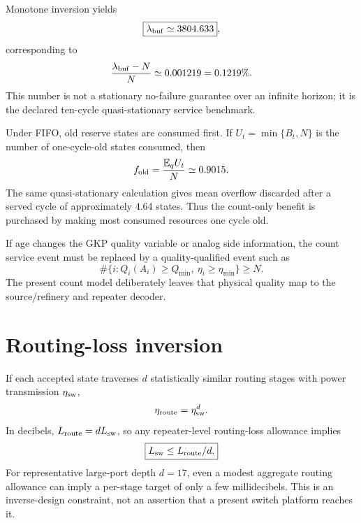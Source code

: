 \documentclass[aps,prx,preprint,superscriptaddress,nofootinbib,longbibliography]{revtex4-2}
\newcommand{\E}{\mathbb E}\newcommand{\Prob}{\mathbb P}
\begin{document}
Monotone inversion yields
\begin{equation}
\boxed{\lambda_{\rm buf}\simeq3804.633},
\end{equation}
corresponding to
\begin{equation}
\frac{\lambda_{\rm buf}-N}{N}\simeq0.001219=0.1219\%.
\end{equation}
This number is not a stationary no-failure guarantee over an infinite horizon; it is the declared ten-cycle quasi-stationary service benchmark.

Under FIFO, old reserve states are consumed first. If $U_t=\min\{B_t,N\}$ is the number of one-cycle-old states consumed, then
\begin{equation}
f_{\rm old}=\frac{\E_q U_t}{N}\simeq0.9015.
\end{equation}
The same quasi-stationary calculation gives mean overflow discarded after a served cycle of approximately 4.64 states. Thus the count-only benefit is purchased by making most consumed resources one cycle old.

If age changes the GKP quality variable or analog side information, the count service event must be replaced by a quality-qualified event such as
\begin{equation}
\#\{i:Q_i(A_i)\ge Q_{\min},\ \eta_i\ge\eta_{\min}\}\ge N.
\end{equation}
The present count model deliberately leaves that physical quality map to the source/refinery and repeater decoder.

\section{Routing-loss inversion}
If each accepted state traverses $d$ statistically similar routing stages with power transmission $\eta_{\rm sw}$,
\begin{equation}
\eta_{\rm route}=\eta_{\rm sw}^d.
\end{equation}
In decibels, $L_{\rm route}=dL_{\rm sw}$, so any repeater-level routing-loss allowance implies
\begin{equation}
\boxed{L_{\rm sw}\le L_{\rm route}/d.}
\end{equation}
For representative large-port depth $d=17$, even a modest aggregate routing allowance can imply a per-stage target of only a few millidecibels. This is an inverse-design constraint, not an assertion that a present switch platform reaches it.
\end{document}
